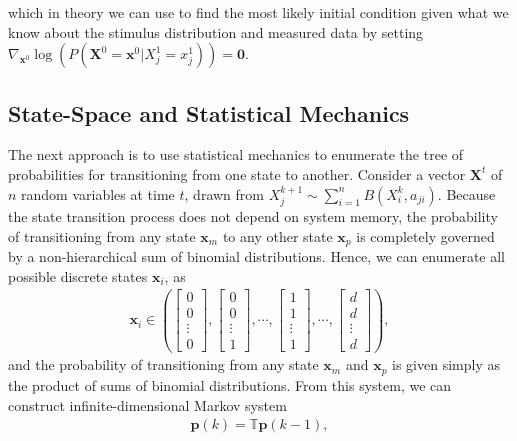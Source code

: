 \documentclass[superscriptaddress]{revtex4-1}
\begin{document}
which in theory we can use to find the most likely initial condition given what we know about the stimulus distribution and measured data by setting $\nabla_{\bm{x}^0} \log(P(\bm{X}^0 = \bm{x}^0 | X_j^1 = x_j^1)) = \bm{0}$. 




\subsection{State-Space and Statistical Mechanics}
The next approach is to use statistical mechanics to enumerate the tree of probabilities for transitioning from one state to another. Consider a vector $\bm{X}^t$ of $n$ random variables at time $t$, drawn from $X_j^{k+1} \sim \sum_{i=1}^n B(X_i^k, a_{ji})$. Because the state transition process does not depend on system memory, the probability of transitioning from any state $\bm{x}_m$ to any other state $\bm{x}_p$ is completely governed by a non-hierarchical sum of binomial distributions. Hence, we can enumerate all possible discrete states $\bm{x}_i$, as
\begin{align*}
\bm{x}_i \in 
\left( 
\begin{bmatrix}
0 \\ 0 \\ \vdots \\ 0
\end{bmatrix},
\begin{bmatrix}
0 \\ 0 \\ \vdots \\ 1
\end{bmatrix},
\dotsm,
\begin{bmatrix}
1 \\ 1 \\ \vdots \\ 1
\end{bmatrix},
\dotsm,
\begin{bmatrix}
d \\ d \\ \vdots \\ d
\end{bmatrix}
\right),
\end{align*}
and the probability of transitioning from any state $\bm{x}_m$ and $\bm{x}_p$ is given simply as the product of sums of binomial distributions. From this system, we can construct infinite-dimensional Markov system
\begin{align*}
\bm{p}(k) = \mathbb{T}\bm{p}(k-1),
\end{align*}
\end{document}
